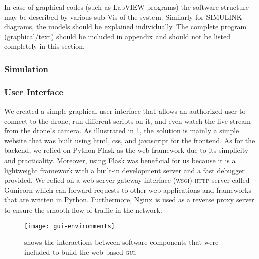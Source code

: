 \documentclass[../main.tex]{subfiles}
\begin{document}
\begin{newrequirements}
\begin{todolist}
    \item In case of graphical codes (such as 
        LabVIEW programs) the software 
        structure may be described by various 
        sub-Vis of the system. Similarly for 
        SIMULINK diagrams, the models should be 
        explained individually. The complete 
        program (graphical/text) should be 
        included in appendix and should not be 
        listed completely in this section. 
                
    \end{todolist}
\end{newrequirements}

\subsubsection{Simulation}

\lipsum[5]

\subsubsection{User Interface}

We created a simple graphical user interface that allows an authorized user 
to connect to the drone, run different scripts on it, and even watch the live 
stream from the drone's camera. 
As illustrated in \cref{fig:gui-environments}, the solution is mainly a simple 
website that was built using html, css, and javascript for the frontend. As 
for the backend, we relied on Python Flask as the web framework due to 
its simplicity and practicality. Moreover, using Flask was beneficial for us 
because it is a lightweight framework with a built-in development server and a 
fast debugger provided. 
We relied on a web server gateway interface (\textsc{wsgi}) \textsc{http} 
server called Gunicorn which can forward requests to other web applications 
and frameworks that are written in Python.
Furthermore, Nginx is used as a reverse proxy server to ensure the smooth flow 
of traffic in the network. 
\begin{figure}[tbp] 
	\centering
	\texttt{[image: gui-environments]} 
	\caption{shows the interactions between software components that were included to 
		build the web-based \textsc{gui}.}
	\label{fig:gui-environments} 
\end{figure}
\end{document}
